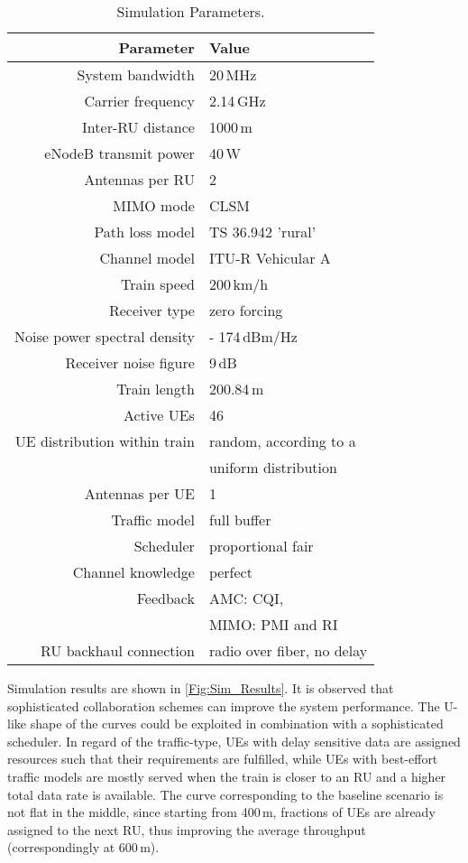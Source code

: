 \documentclass[a4paper,conference,twocolumn,10pt]{IEEEtran}
\begin{document}
\begin{table}
	\centering        
	\caption{Simulation Parameters.}\label{Tab:Simulationparameters}  
	\begin{tabular}{r|l}
		\toprule
		\textbf{Parameter} & \textbf{Value} \\
		\hline
		System bandwidth & 20\,MHz \\
		Carrier frequency & 2.14\,GHz \\
		Inter-\ac{RU} distance & 1000\,m \\
		eNodeB transmit power  & 40\,W\\
		Antennas per \ac{RU} & 2 \\
		MIMO mode & CLSM \\
		Path loss model & TS 36.942 'rural'  \cite{3gppTS36942}\\
		Channel model &  ITU-R Vehicular A \cite{ItuRVehA} \\
		Train speed & 200\,km/h\\
		Receiver type & zero forcing \\
		Noise power spectral density & - 174\,dBm/Hz \\
		Receiver noise figure & 9\,dB \\
		Train length & 200.84\,m \\
		Active \acp{UE} & 46 \\
		\ac{UE} distribution within train & random, according to a\\
		& uniform distribution \\ 
		Antennas per \ac{UE} & 1 \\
		Traffic model & full buffer \\
		Scheduler & proportional fair \\
		Channel knowledge & perfect \\
		Feedback & AMC: CQI, \\
		&  MIMO: PMI and RI \\
		\ac{RU} backhaul connection & radio over fiber, no delay \\
		\bottomrule
	\end{tabular} 
\end{table}

Simulation results are shown in \cref{Fig:Sim_Results}. It is observed that sophisticated collaboration schemes can improve the system performance. The U-like shape of the curves could be exploited in combination with a sophisticated scheduler. In regard of the traffic-type, \acp{UE} with delay sensitive data are assigned resources such that their requirements are fulfilled, while \acp{UE} with best-effort traffic models are mostly served when the train is closer to an \ac{RU} and a higher total data rate is available. The curve corresponding to the baseline scenario is not flat in the middle, since starting from 400\,m, fractions of \acp{UE} are already assigned to the next \ac{RU}, thus improving the average throughput (correspondingly at 600\,m).\\
\end{document}
